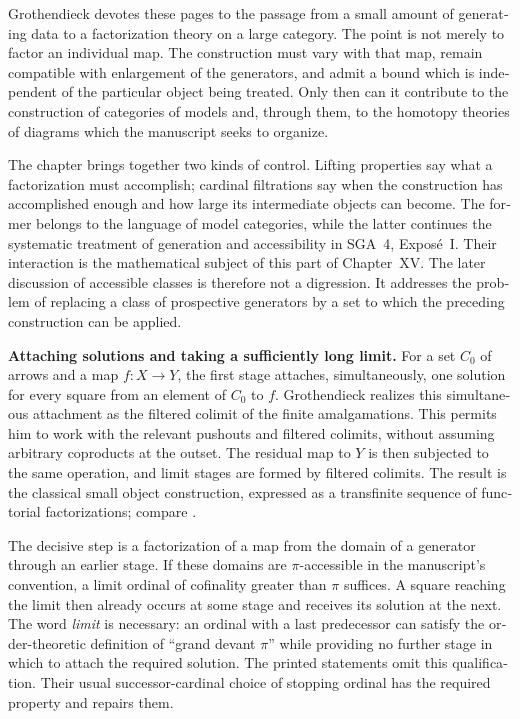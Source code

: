 \begin{otherlanguage}{english}
Grothendieck devotes these pages to the passage from a small amount of generating data to a factorization theory on a large category. The point is not merely to factor an individual map. The construction must vary with that map, remain compatible with enlargement of the generators, and admit a bound which is independent of the particular object being treated. Only then can it contribute to the construction of categories of models and, through them, to the homotopy theories of diagrams which the manuscript seeks to organize.

The chapter brings together two kinds of control. Lifting properties say what a factorization must accomplish; cardinal filtrations say when the construction has accomplished enough and how large its intermediate objects can become. The former belongs to the language of model categories, while the latter continues the systematic treatment of generation and accessibility in SGA~4, Expos\'e~I. Their interaction is the mathematical subject of this part of Chapter~XV. The later discussion of accessible classes is therefore not a digression. It addresses the problem of replacing a class of prospective generators by a set to which the preceding construction can be applied.

\medskip\noindent\textbf{Attaching solutions and taking a sufficiently long limit.}
For a set $C_0$ of arrows and a map $f:X\to Y$, the first stage attaches, simultaneously, one solution for every square from an element of $C_0$ to $f$. Grothendieck realizes this simultaneous attachment as the filtered colimit of the finite amalgamations. This permits him to work with the relevant pushouts and filtered colimits, without assuming arbitrary coproducts at the outset. The residual map to $Y$ is then subjected to the same operation, and limit stages are formed by filtered colimits. The result is the classical small object construction, expressed as a transfinite sequence of functorial factorizations; compare \citet[Chapter~12]{Riehl2014}.

The decisive step is a factorization of a map from the domain of a generator through an earlier stage. If these domains are $\pi$-accessible in the manuscript's convention, a limit ordinal of cofinality greater than $\pi$ suffices. A square reaching the limit then already occurs at some stage and receives its solution at the next. The word \emph{limit} is necessary: an ordinal with a last predecessor can satisfy the order-theoretic definition of ``grand devant $\pi$'' while providing no further stage in which to attach the required solution. The printed statements omit this qualification. Their usual successor-cardinal choice of stopping ordinal has the required property and repairs them.


\end{otherlanguage}
